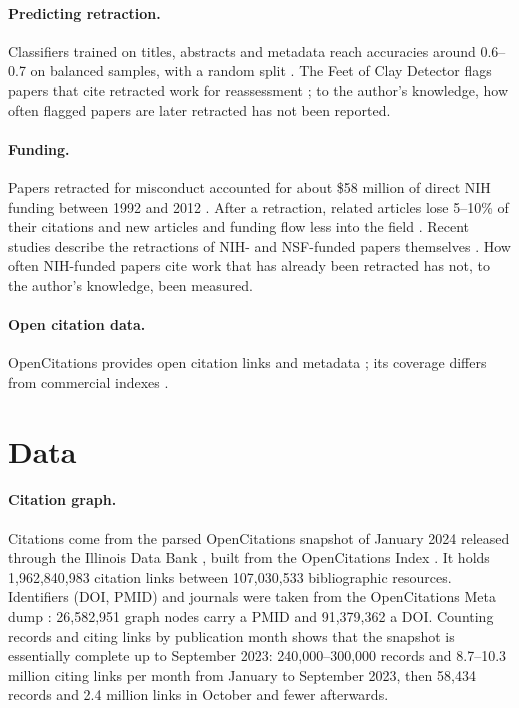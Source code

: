 \documentclass[pdflatex,sn-basic]{sn-jnl}
\begin{document}
\paragraph{Predicting retraction.} Classifiers trained on titles, abstracts and metadata reach accuracies around 0.6--0.7
on balanced samples, with a random split \citep{fletcher2025predicting}. The Feet of Clay Detector flags papers that
cite retracted work for reassessment \citep{cabanac2024chain}; to the author's knowledge, how often flagged papers are later
retracted has not been reported.

\paragraph{Funding.} Papers retracted for misconduct accounted for about \$58 million of direct NIH funding
between 1992 and 2012 \citep{stern2014costs}. After a retraction, related articles lose 5--10\% of their citations and
new articles and funding flow less into the field \citep{azoulay2015retractions}. Recent studies describe the
retractions of NIH- and NSF-funded papers themselves \citep{peterson2025nih,salisbury2026nih}. How often NIH-funded
papers cite work that has already been retracted has not, to the author's knowledge, been measured.

\paragraph{Open citation data.} OpenCitations provides open citation links and metadata
\citep{peroni2020opencitations,heibi2019coci,massari2024meta}; its coverage differs from commercial indexes
\citep{martinmartin2021coverage}.
\section{Data}\label{sec:data}

\paragraph{Citation graph.} Citations come from the parsed OpenCitations snapshot of January 2024 released through
the Illinois Data Bank \citep{arjomandi2024dataset}, built from the OpenCitations Index \citep{peroni2020opencitations,heibi2019coci}.
It holds 1,962,840,983 citation links between 107,030,533 bibliographic resources. Identifiers (DOI, PMID) and journals
were taken from the OpenCitations Meta dump \citep{massari2024meta,ocmeta2024dump}: 26,582,951 graph nodes carry a PMID
and 91,379,362 a DOI. Counting records and citing links by publication month shows that the snapshot is essentially
complete up to September 2023: 240,000--300,000 records and 8.7--10.3 million citing links per month from January to
September 2023, then 58,434 records and 2.4 million links in October and fewer afterwards.
\end{document}
